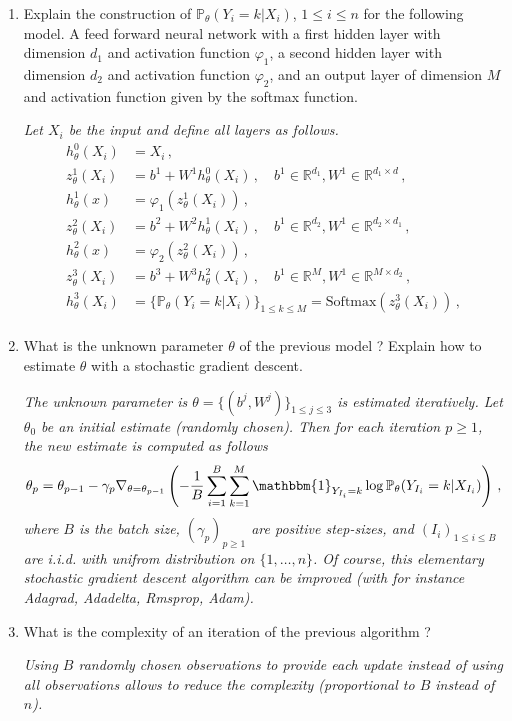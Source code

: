 \documentclass[a4paper,10pt,fleqn]{article}
\newcommand{\eqsp}{\,}
\newcommand{\1}{\ensuremath{\mathbbm{1}}}
\begin{document}
\begin{enumerate}
\item Explain the construction of $\mathbb{P}_{\theta}(Y_i = k | X_i)$, $1\leqslant i\leqslant n$ for the following model. A feed forward neural network with a first hidden layer with dimension $d_1$ and activation function $\varphi_1$,  a second hidden layer with dimension $d_2$ and activation function $\varphi_2$, and an output layer of dimension $M$ and activation function given by the softmax function.

\vspace{.2cm}

{\em
Let $X_i$ be the input and define all layers as follows.
\begin{align*}
h_{\theta}^0(X_i) &= X_i\eqsp,\\
z_{\theta}^1(X_i)  &= b^1 + W^1h_{\theta}^{0}(X_i)\eqsp, \quad b^1\in\mathbb{R}^{d_1}, W^1 \in\mathbb{R}^{d_1\times d}\eqsp,\\
h_{\theta}^1(x)  &= \varphi_1(z_{\theta}^{1}(X_i))\eqsp,\\
z_{\theta}^2(X_i)  &= b^2 + W^2h_{\theta}^{1}(X_i)\eqsp,\quad b^1\in\mathbb{R}^{d_2}, W^1 \in\mathbb{R}^{d_2\times d_1}\eqsp,\\
h_{\theta}^2(x)  &= \varphi_2(z_{\theta}^{2}(X_i))\eqsp,\\
z_{\theta}^3(X_i)  &= b^3 + W^3h_{\theta}^{2}(X_i)\eqsp,\quad b^1\in\mathbb{R}^{M}, W^1 \in\mathbb{R}^{M\times d_2}\eqsp,\\
h_{\theta}^3(X_i)  &= \{\mathbb{P}_{\theta}(Y_i = k | X_i)\}_{1\leq k \leq M} = \mathrm{Softmax}(z_{\theta}^{3}(X_i))\eqsp,\\
\end{align*}
}
\item What is the unknown parameter $\theta$ of the previous model ? Explain how to estimate $\theta$ with  a stochastic gradient descent.

\vspace{.2cm}

{\em
The unknown parameter is $\theta = \{(b^j,W^j)\}_{1\leq j \leq 3}$ is estimated iteratively. Let $\theta_0$ be an initial estimate (randomly chosen). Then for each iteration $p\geqslant 1$, the new estimate is computed as follows
$$
\theta_p = \theta_{p-1} - \gamma_p \nabla_{\theta=\theta_{p-1}} \left(-\frac{1}{B} \sum_{i=1}^B\sum_{k=1}^{M} \1_{Y_{I_i}=k}\log \mathbb{P}_{\theta}(Y_{I_i} = k | X_{I_i})\right)\eqsp,
$$
where $B$ is the batch size, $(\gamma_p)_{p\geqslant 1}$ are positive step-sizes, and $(I_i)_{1 \leqslant i \leqslant B}$ are i.i.d. with unifrom distribution on  $\{1,\ldots,n\}$. Of course, this elementary stochastic gradient descent algorithm can be improved (with for instance Adagrad, Adadelta, Rmsprop, Adam).
}
\item What is the complexity of an iteration of the previous algorithm ?

\vspace{.2cm}

{\em
Using $B$ randomly chosen observations to provide each update instead of using all observations allows to reduce the complexity (proportional to $B$ instead of $n$).
}
\end{enumerate}
\end{document}

